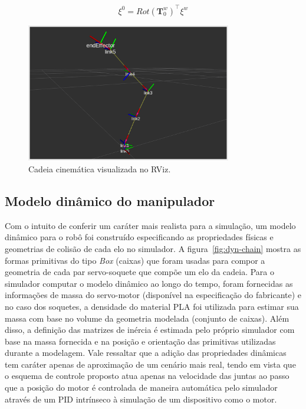 \begin{equation}
    \xi^0 = {Rot(\mathbf{T}^w_0)}^\top \xi^w
\end{equation}

\begin{figure}
    \centering
    \includegraphics[width=0.8\textwidth]{./Images/rviz-chain.png}
    \caption{Cadeia cinemática visualizada no RViz.}\label{fig:kin-chain}
\end{figure}

\subsection*{Modelo dinâmico do manipulador}

Com o intuito de conferir um caráter mais realista para a simulação, um modelo
dinâmico para o robô foi construído especificando as propriedades físicas e
geometrias de colisão de cada elo no simulador. A figura~\ref{fig:dyn-chain}
mostra as formas primitivas do tipo \emph{Box} (caixas) que foram usadas para
compor a geometria de cada par servo-soquete que compõe um elo da cadeia. Para
o simulador computar o modelo dinâmico ao longo do tempo, foram fornecidas as
informações de massa do servo-motor (disponível na especificação do fabricante)
e no caso dos soquetes, a densidade do material PLA foi utilizada para estimar
sua massa com base no volume da geometria modelada (conjunto de caixas). Além
disso, a definição das matrizes de inércia é estimada pelo próprio
simulador com base na massa fornecida e na posição e
orientação das primitivas utilizadas durante a modelagem. Vale ressaltar que a
adição das propriedades dinâmicas tem caráter apenas de aproximação de um cenário
mais real, tendo em vista que o esquema de controle proposto atua apenas na
velocidade das juntas ao passo que a posição do motor é controlada de maneira
automática pelo simulador através de um PID intrínseco à simulação de um
dispositivo como o motor.

